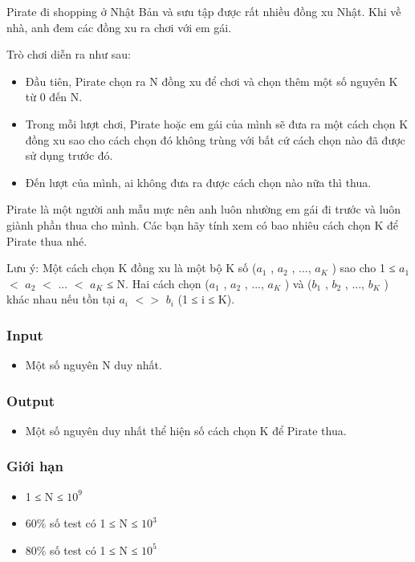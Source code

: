 



   Pirate đi shopping ở Nhật Bản và sưu tập được rất nhiều đồng xu Nhật. Khi về nhà, anh đem các đồng xu ra chơi với em gái.  

   Trò chơi diễn ra như sau:  
\begin{itemize}
	\item     Đầu tiên, Pirate chọn ra N đồng xu để chơi và chọn thêm một số nguyên K từ 0 đến N.   
	\item     Trong mỗi lượt chơi, Pirate hoặc em gái của mình sẽ đưa ra một cách chọn K đồng xu sao cho cách chọn đó không trùng với bất cứ cách chọn nào đã được sử dụng trước đó.   
	\item     Đến lượt của mình, ai không đưa ra được cách chọn nào nữa thì thua.   
\end{itemize}

   Pirate là một người anh mẫu mực nên anh luôn nhường em gái đi trước và luôn giành phần thua cho mình. Các bạn hãy tính xem có bao nhiêu cách chọn K để Pirate thua nhé.  

   Lưu ý: Một cách chọn K đồng xu là một bộ K số ($a_{1}$   , $a_{2}$   , ..., $a_{K}$   ) sao cho 1 ≤ $a_{1}$   $<$ $a_{2}$   $<$ ... $<$ $a_{K}$   ≤ N. Hai cách chọn ($a_{1}$   , $a_{2}$   , ..., $a_{K}$   ) và ($b_{1}$   , $b_{2}$   , ..., $b_{K}$   ) khác nhau nếu tồn tại $a_{i}$   $<$$>$ $b_{i}$   (1 ≤ i ≤ K).  

\subsubsection{   Input  }
\begin{itemize}
	\item     Một số nguyên N duy nhất.   
\end{itemize}

\subsubsection{   Output  }
\begin{itemize}
	\item     Một số nguyên duy nhất thể hiện số cách chọn K để Pirate thua.   
\end{itemize}

\subsubsection{   Giới hạn  }
\begin{itemize}
	\item     1 ≤ N ≤ $10^{9}$
	\item     60\% số test có 1 ≤ N ≤ $10^{3}$
	\item     80\% số test có 1 ≤ N ≤ $10^{5}$
\end{itemize}

